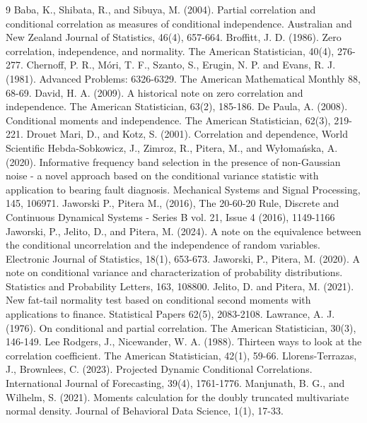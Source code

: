 \documentclass[sn-mathphys,Numbered,11pt]{sn-jnl}%
\theoremstyle{thmstyleone}%
\begin{document}
\begin{thebibliography}{9}
 Baba, K., Shibata, R., and Sibuya, M. (2004). Partial correlation and conditional correlation as measures of conditional independence. Australian and New Zealand Journal of Statistics, 46(4), 657-664.
 Broffitt, J. D. (1986). Zero correlation, independence, and normality. The American Statistician, 40(4), 276-277.
 Chernoff, P. R., M{\'o}ri, T. F., Szanto, S., Erugin, N. P. and Evans, R. J. (1981). Advanced Problems: 6326-6329. The American Mathematical Monthly 88, 68-69.
 David, H. A. (2009). A historical note on zero correlation and independence. The American Statistician, 63(2), 185-186.
 De Paula, A. (2008). Conditional moments and independence. The American Statistician, 62(3), 219-221.
 Drouet Mari, D., and Kotz, S. (2001). Correlation and dependence, World Scientific
 Hebda-Sobkowicz, J., Zimroz, R., Pitera, M., and Wy{\l}oma{\'n}ska, A. (2020). Informative frequency band selection in the presence of non-Gaussian noise - a novel approach based on the conditional variance statistic with application to bearing fault diagnosis. Mechanical Systems and Signal Processing, 145, 106971.
 Jaworski P., Pitera M., (2016), The 20-60-20 Rule, Discrete and Continuous Dynamical Systems - Series B vol. 21, Issue 4 (2016), 1149-1166
 Jaworski, P., Jelito, D., and Pitera, M. (2024). A note on the equivalence between the conditional uncorrelation and the independence of random variables. Electronic Journal of Statistics, 18(1), 653-673.
 Jaworski, P., Pitera, M. (2020). A note on conditional variance and characterization of probability distributions. Statistics and Probability Letters, 163, 108800.
 Jelito, D. and Pitera, M. (2021). New fat-tail normality test based on
conditional second moments with applications to finance. Statistical Papers 62(5), 2083-2108.
 Lawrance, A. J. (1976). On conditional and partial correlation. The American Statistician, 30(3), 146-149.
 Lee Rodgers, J.,  Nicewander, W. A. (1988). Thirteen ways to look at the correlation coefficient. The American Statistician, 42(1), 59-66.
 Llorens-Terrazas, J.,  Brownlees, C. (2023). Projected Dynamic Conditional Correlations. International Journal of Forecasting, 39(4), 1761-1776.
 Manjunath, B. G., and Wilhelm, S. (2021). Moments calculation for the doubly truncated multivariate normal density. Journal of Behavioral Data Science, 1(1), 17-33.

\end{thebibliography}
\end{document}
